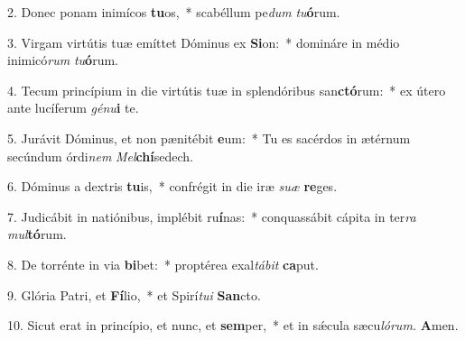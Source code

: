 \item 2. Donec ponam inimícos \textbf{tu}os,~* scabéllum pe\hspace{0.03em}\textit{dum} \textit{tu}\textbf{ó}rum.
\item 3. Virgam virtútis tuæ emíttet Dóminus ex \textbf{Si}on:~* domináre in médio inimicó\textit{rum} \textit{tu}\textbf{ó}rum.
\item 4. Tecum princípium in die virtútis tuæ in splendóribus san\textbf{ctó}rum:~* ex útero ante lucíferum \textit{génu}\textbf{i} te.
\item 5. Jurávit Dóminus, et non pænitébit \textbf{e}um:~* Tu es sacérdos in ætérnum secúndum órdi\textit{nem} \textit{Mel}\textbf{chí}sedech.
\item 6. Dóminus a dextris \textbf{tu}is,~* confrégit in die iræ \textit{suæ} \textbf{re}ges.
\item 7. Judicábit in natiónibus, implébit ru\textbf{í}nas:~* conquassábit cápita in ter\textit{ra} \textit{mul}\textbf{tó}rum.
\item 8. De torrénte in via \textbf{bi}bet:~* proptérea exal\textit{tábit} \textbf{ca}put.
\item 9. Glória Patri, et \textbf{Fí}lio,~* et Spirí\textit{tui} \textbf{San}cto.
\item 10. Sicut erat in princípio, et nunc, et \textbf{sem}per,~* et in sǽcula sæcu\hspace{0.03em}\textit{lórum.} \textbf{A}men.
